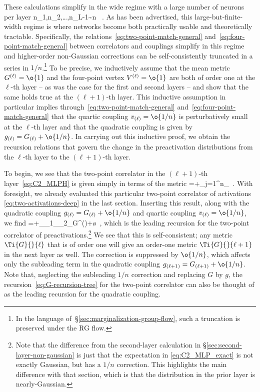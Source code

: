 These calculations simplify in the wide regime with a large number of neurons per layer
\be\label{eq:wide-regime}
n_1,n_2,\ldots,n_{L-1}\sim n \, .
\ee 
As has been advertised, this large-but-finite-width regime is where networks become both practically usable and theoretically tractable.
Specifically, the relations~\eqref{eq:two-point-match-general} and~\eqref{eq:four-point-match-general} between correlators and couplings simplify in this regime and higher-order non-Gaussian corrections can be self-consistently truncated in a series in $1/n$.\footnote{In the language of~\S\ref{sec:marginalization-group-flow}, such a truncation is preserved under the RG flow.}
To be precise, we inductively assume that the mean metric $G^{(\ell)}=\o{1}$ and the four-point vertex $V^{(\ell)}=\o{1}$ are both of order one at the $\ell$-th layer  -- as was the case for the first and second layers -- and show that the same holds true at the $(\ell+1)$-th layer.
This inductive assumption in particular implies through~\eqref{eq:two-point-match-general} and~\eqref{eq:four-point-match-general} that the quartic coupling $v_{(\ell)}=\o{1/n}$ is perturbatively small at the $\ell$-th layer and that the quadratic coupling is given by $g_{(\ell)}=G_{(\ell)}+\o{1/n}$. In carrying out this inductive proof, we obtain the recursion relations that govern the change in the preactivation distributions from the $\ell$-th layer to the $(\ell+1)$-th layer.%




To begin, we see that the two-point correlator in the $(\ell+1)$-th layer~\eqref{eq:C2_MLPH} is given simply in terms of the metric
\be\label{eq:C2_MLP_exact}
=+\sum_{j=1}^{n_{\ell}}\, .
\ee
With foresight, we already evaluated this particular two-point correlator of activations \eqref{eq:two-activations-deep} in the last section. Inserting this result, along with the quadratic coupling $g_{(\ell)}=G_{(\ell)}+\o{1/n}$ and quartic coupling $v_{(\ell)}=\o{1/n}$, we find  
\be\label{eq:G-recursion-tree}
=+\bra \sigma_{\alpha_1}\sigma_{\alpha_2}\ket_{G^{(\ell)}}+\o{}\, ,
\ee
which is the leading recursion for the two-point correlator of preactivations.\footnote{Note that the difference from the second-layer calculation in \S\ref{sec:second-layer-non-gaussian} is just that the expectation in \eqref{eq:C2_MLP_exact} is not exactly Gaussian, but has a $1/n$ correction. This highlights the main difference with that section, which is that the distribution in the prior layer is nearly-Gaussian.} We see  that this is self-consistent; any metric $\Ti{G}{}{\ell}$ that is of order one will give an order-one metric $\Ti{G}{}{\ell+1}$ in the next layer as well. The correction is suppressed by $\o{1/n}$, which affects only the subleading term  in the  quadratic coupling $g_{(\ell+1)}=G_{(\ell+1)}+\o{1/n}$. Note that, neglecting the subleading $1/n$ correction and replacing $G$ by $g$,  the recursion~\eqref{eq:G-recursion-tree} for the two-point correlator can also be thought of as the leading recursion for the quadratic coupling.

